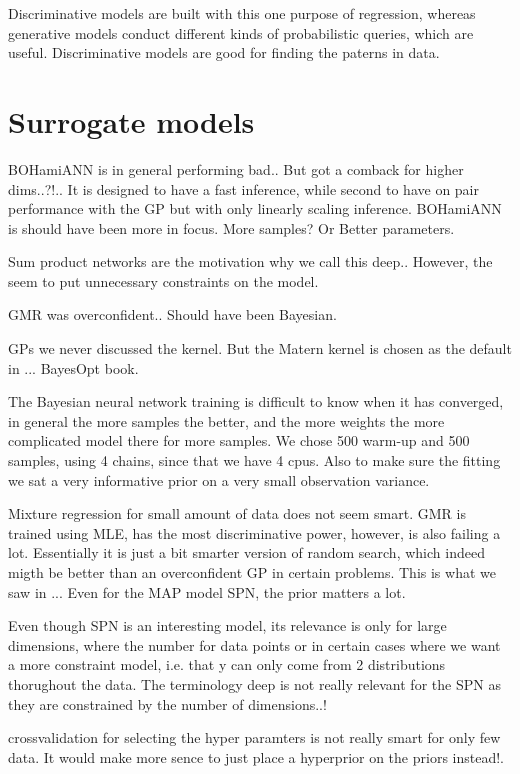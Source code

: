 Discriminative models are built with this one purpose of regression, whereas generative models
conduct different kinds of probabilistic queries, which are useful. Discriminative models are good
for finding the paterns in data.

\section{Surrogate models}
BOHamiANN is in general performing bad.. But got a comback for higher dims..?!.. It is designed to
have a fast inference, while second to have on pair performance with the GP but with only linearly
scaling inference. BOHamiANN is should have been more in focus. More samples? Or Better parameters. 

Sum product networks are the motivation why we call this deep.. However, the seem to put unnecessary constraints on 
the model. 

GMR was overconfident.. Should have been Bayesian.

GPs we never discussed the kernel. But the Matern kernel is chosen as the default in ... BayesOpt book. 

The Bayesian neural network training is difficult to know when it has converged, in general the more samples the better, 
and the more weights the more complicated model there for more samples. We chose 500 warm-up and 500 samples, using 4
chains, since that we have 4 cpus. Also to make sure the fitting we sat a very informative prior on a very small observation
variance. 

Mixture regression for small amount of data does not seem smart. GMR is trained using MLE, has the most discriminative power,
however, is also failing a lot. Essentially it is just a bit smarter version of random search, which indeed migth be
better than an overconfident GP in certain problems. This is what we saw in ... Even for the MAP model SPN, the prior
matters a lot. 

Even though SPN is an interesting model, its relevance is only for large dimensions, where the number for data points
or in certain cases where we want a more constraint model, i.e. that y can only come from 2 distributions thorughout the
data. The terminology deep is not really relevant for the SPN as they are constrained by the number of dimensions..!

crossvalidation for selecting the hyper paramters is not really smart for only few data. It would make more sence 
to just place a hyperprior on the priors instead!. 


